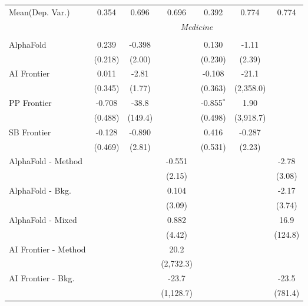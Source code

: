 \begin{tabular}{lcccccc}
Mean(Dep. Var.) & 0.354 & 0.696 & 0.696 & 0.392 & 0.774 & 0.774 \\
 & \multicolumn{6}{c}{\textit{Medicine}} \\ \\
   AlphaFold            & 0.239   & -0.398  &           & 0.130        & -1.11     &   \\   
                        & (0.218) & (2.00)  &           & (0.230)      & (2.39)    &   \\   
   AI Frontier          & 0.011   & -2.81   &           & -0.108       & -21.1     &   \\   
                        & (0.345) & (1.77)  &           & (0.363)      & (2,358.0) &   \\   
   PP Frontier          & -0.708  & -38.8   &           & -0.855$^{*}$ & 1.90      &   \\   
                        & (0.488) & (149.4) &           & (0.498)      & (3,918.7) &   \\   
   SB Frontier          & -0.128  & -0.890  &           & 0.416        & -0.287    &   \\   
                        & (0.469) & (2.81)  &           & (0.531)      & (2.23)    &   \\   
   AlphaFold - Method   &         &         & -0.551    &              &           & -2.78\\   
                        &         &         & (2.15)    &              &           & (3.08)\\   
   AlphaFold - Bkg.     &         &         & 0.104     &              &           & -2.17\\   
                        &         &         & (3.09)    &              &           & (3.74)\\   
   AlphaFold - Mixed    &         &         & 0.882     &              &           & 16.9\\   
                        &         &         & (4.42)    &              &           & (124.8)\\   
   AI Frontier - Method &         &         & 20.2      &              &           &   \\   
                        &         &         & (2,732.3) &              &           &   \\   
   AI Frontier - Bkg.   &         &         & -23.7     &              &           & -23.5\\   
                        &         &         & (1,128.7) &              &           & (781.4)\\   

\end{tabular}
